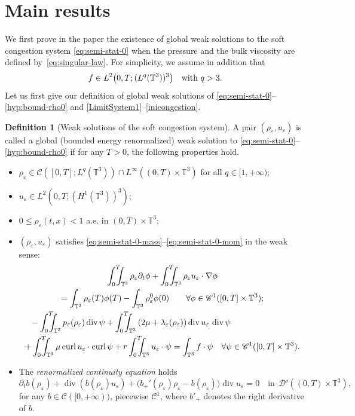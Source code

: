 \documentclass[JEP,XML,SOM,Unicode,NoEqCountersInSection]{cedram}
\let\mathcal\mathscr
\let\cal\mathcal
\newcommand{\<}{\bigl\langle}
\renewcommand{\>}{\bigr\rangle}
\newcommand{\intTTT}{\int_0^T\hspace*{-2.5mm}\int_{\TT}}
\newcommand{\labeleq}[1]{}
\theoremstyle{definition}
\newtheorem{definition}[thm]{Definition}
\theoremstyle{remark}
\newcommand{\TT}{\mathbb{T}^3}
\DeclareMathOperator{\curl}{curl}
\DeclareMathOperator{\Div}{div}
\let\ep\varepsilon
\begin{document}
\section{Main results}
We first prove in the paper the existence of global weak solutions to the soft congestion system \eqref{eq:semi-stat-0} when the pressure and the bulk viscosity are defined by~\eqref{eq:singular-law}. For simplicity, we assume in addition that
\begin{equation}\label{hyp:f}
f \in L^2\big(0,T; (L^q(\TT))^3\big) \quad\hbox{with } q>3.
\end{equation}
Let us first give our definition of global weak solutions of \eqref{eq:semi-stat-0}--\eqref{hyp:bound-rho0} and \eqref{LimitSystem1}--\eqref{inicongestion}.
\begin{definition}[Weak solutions of the soft congestion system]
A pair $(\rho_\ep,u_\ep)$ is called a global (bounded energy renormalized) weak solution to \eqref{eq:semi-stat-0}--\eqref{hyp:bound-rho0} if for any $T > 0$, the following properties hold.
\begin{itemize}
\item $\rho_\ep \in \mathcal{C}([0,T];L^q(\TT)) \cap L^\infty((0,T) \times \TT)$ for all $q \in [1, +\infty)$;
\item
$u_\ep\in L^2(0,T;(H^1(\TT))^3)$;
\item $0 \leq \rho_\ep(t,x) < 1$ a.e. in $(0,T)\times \TT$;
\item $(\rho_\ep,u_\ep)$ satisfies \eqref{eq:semi-stat-0-mass}--\eqref{eq:semi-stat-0-mom}
in the weak sense:
\begin{multline*}\labeleq{weak-ep-mass}
\intTTT{\rho_{\ep} \partial_t \phi}
+ \intTTT{\rho_{\ep} u_{\ep} \cdot \nabla \phi} \\
= \int_{\TT}{\rho_\ep(T) \phi(T)} - \int_{\TT}{\rho_\ep^0 \phi(0)}
\qquad \forall \phi \in \mathcal{C}^1([0,T] \times \TT);
\\
\labeleq{weak-ep-div-mom}
\shoveleft{- \intTTT{p_{\ep}(\rho_{\ep})\Div \psi}
+ \intTTT{(2\mu+\lambda_{\ep}(\rho_{\ep}))
\Div u_{\ep} \, \Div \psi}} \\
+ \intTTT
\mu\curl u_{\ep} \cdot \curl \psi
+ r\intTTT{u_{\ep} \cdot \psi}
= \int_{\TT}{f \cdot \psi}
\quad \forall \psi \in \mathcal{C}^1([0,T] \times \TT).
\end{multline*} 
\item The \emph{renormalized continuity equation} holds
\begin{equation*}\labeleq{renormalized-ep}
\partial_t b(\rho_{\ep}) + \Div(b(\rho_{\ep}) u_{\ep})
+ \big(b_+'(\rho_{\ep})\rho_{\ep}
- b(\rho_{\ep})\big)\Div u_{\ep} = 0
\quad \text{in}~~\mathcal{D}'((0,T)\times \TT),
\end{equation*}
for any $b\in \mathcal{C}([0,+\infty))$, piecewise ${\cal C}^1$, where $b'_+$
denotes the right derivative of $b$.


\end{itemize}
\end{definition}
\end{document}

